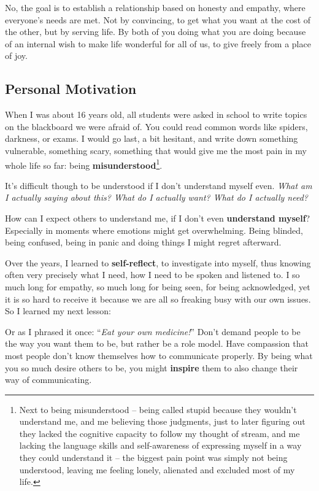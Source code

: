 No, the goal is to establish a relationship based on honesty and empathy, where everyone's needs are met.
Not by convincing, to get what you want at the cost of the other, but by serving life.
By both of you doing what you are doing because of an internal wish to make life wonderful for all of us, to give freely from a place of joy.

\subsection{Personal Motivation}\label{subsec:personal-motivation}

When I was about 16 years old, all students were asked in school to write topics on the blackboard we were afraid of.
You could read common words like spiders, darkness, or exams.
I would go last, a bit hesitant, and write down something vulnerable, something scary, something that would give me the most pain in my whole life so far: being \textbf{misunderstood}\footnote{Next to being misunderstood -- being called stupid because they wouldn't understand me, and me believing those judgments, just to later figuring out they lacked the cognitive capacity to follow my thought of stream, and me lacking the language skills and self-awareness of expressing myself in a way they could understand it -- the biggest pain point was simply not being understood, leaving me feeling lonely, alienated and excluded most of my life.}.

It's difficult though to be understood if I don't understand myself even.
\textit{
    What am I actually saying about this?
    What do I actually want?
    What do I actually need?
}

How can I expect others to understand me, if I don't even \textbf{understand myself}?
Especially in moments where emotions might get overwhelming.
Being blinded, being confused, being in panic and doing things I might regret afterward.

Over the years, I learned to \textbf{self-reflect}, to investigate into myself, thus knowing often very precisely what I need, how I need to be spoken and listened to.
I so much long for empathy, so much long for being seen, for being acknowledged, yet it is so hard to receive it because we are all so freaking busy with our own issues.
So I learned my next lesson:


Or as I phrased it once: ``\textit{Eat your own medicine!}''
Don't demand people to be the way you want them to be, but rather be a role model.
Have compassion that most people don't know themselves how to communicate properly.
By being what you so much desire others to be, you might \textbf{inspire} them to also change their way of communicating.

